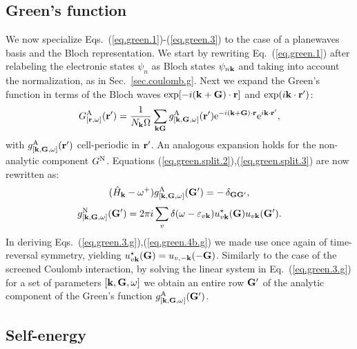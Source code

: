 \documentclass[twocolumn,prb,showpacs,superscriptaddress]{revtex4}
\def\w{\omega}
\def\H{\hat{H}}
\def\E{\varepsilon}
\def\k{{\bf k}}
\def\G{{\bf G}}
\def\Gp{{\bf G^\prime}}
\def\r{{\bf r}}
\def\rp{{\bf r^\prime}}
\begin{document}
\subsection{Green's function}\label{sec.green.g}

We now specialize Eqs.\ (\ref{eq.green.1})-(\ref{eq.green.3}) to the case
of a planewaves basis and the Bloch representation.
We start by rewriting Eq.\ (\ref{eq.green.1}) after relabeling the electronic states
$\psi_n$ as Bloch states $\psi_{n\k}$ and taking into account the
normalization, as in Sec.\ \ref{sec.coulomb.g}.
Next we expand the Green's function in terms
of the Bloch waves ${\rm exp}[-i(\k+\G)\cdot\r]$ and ${\rm exp}(i\k\cdot\rp)$:
  \begin{equation}\label{eq.green.bloch}
  G^{\rm A}_{[\r,\w]} (\rp) = \frac{1}{N_\k\Omega}  \sum_{\k\G} g^{\rm A}_{[\k,\G,\w]}(\rp)
   {\rm e}^{-i(\k+\G)\cdot\r} {\rm e}^{i\k\cdot\rp},
  \end{equation}
with $g^{\rm A}_{[\k,\G,\w]}(\rp)$ cell-periodic in $\rp$. An analogous expansion
holds for the non-analytic component $G^{\rm N}$.
Equations (\ref{eq.green.split.2}),(\ref{eq.green.split.3}) are now rewritten as:
  \begin{equation}\label{eq.green.3.g}
   (\H_\k-\w^+)  g^{\rm A}_{[\k,\G,\w]}(\Gp)  =  -\,\delta_{\G\Gp},
  \end{equation}
  \begin{equation} \label{eq.green.4b.g}
  g^{\rm N}_{[\k,\G,\w]}(\Gp)  =  
  2\pi i \sum_v \delta(\w-\E_{v\k}) u^\star_{v\k}(\G)u_{v\k} (\Gp).
  \end{equation}
In deriving Eqs.\ (\ref{eq.green.3.g}),(\ref{eq.green.4b.g}) we made use once again
of time-reversal symmetry, yielding
$u^\star_{v\k}(\G) = u_{v,-\k}(-\G)$.
Similarly to the case of the screened Coulomb interaction, by solving the
linear system in Eq.\ (\ref{eq.green.3.g}) for a set of parameters $[\k,\G,\w]$ 
we obtain an entire row $\Gp$ of the analytic component of the
Green's function $g^{\rm A}_{[\k,\G,\w]}(\Gp)$.

\subsection{Self-energy}\label{sec.sigma.g}
\end{document}
